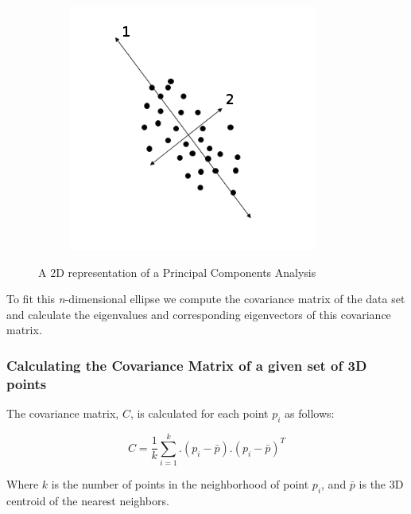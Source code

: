 \begin{figure}[H]
\begin{subfigure}{.5\textwidth}
				\label{fig:sub1}
			\end{subfigure}%
			\begin{subfigure}{.5\textwidth}
				\centering
				\includegraphics[width=1\linewidth]{Includes/images/pca2-ver2}

				\label{fig:sub2}
			\end{subfigure}
			\caption{A 2D representation of a Principal Components Analysis }
		\end{figure} 
		
		To fit this \textit{n}-dimensional ellipse we compute the covariance matrix of the data set and calculate the eigenvalues and corresponding eigenvectors of this covariance matrix.
		
		\subsubsection{Calculating the Covariance Matrix of a given set of 3D points}
			The covariance matrix, $C$, is calculated for each point $p_i$ as follows:
			
			\begin{equation}
			C = \frac{1}{k} \sum_{i=1}^{k}.(p_i - \bar{p}).(p_i - \bar{p})^T
			\end{equation}
			
			Where $k$ is the number of points in the neighborhood of point $p_i$, and $\bar{p}$ is the 3D centroid of the nearest neighbors.
				
